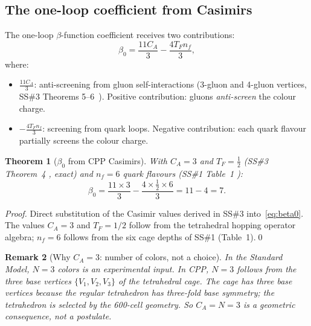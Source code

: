 \documentclass[11pt,a4paper]{article}
\newtheorem{theorem}{Theorem}[section]
\newtheorem{remark}[theorem]{Remark}
\begin{document}
\subsection{The one-loop coefficient from Casimirs}

The one-loop $\beta$-function coefficient receives two contributions:
\begin{equation}
\beta_0 = \frac{11C_A}{3} - \frac{4T_F n_f}{3},
\label{eq:beta0}
\end{equation}
where:
\begin{itemize}
\item $\frac{11C_A}{3}$: anti-screening from gluon self-interactions
  (3-gluon and 4-gluon vertices, SS\#3 Theorems 5--6~\citep{cpp_ss3}).
  Positive contribution: gluons \emph{anti-screen} the colour charge.
\item $-\frac{4T_F n_f}{3}$: screening from quark loops.
  Negative contribution: each quark flavour partially screens
  the colour charge.
\end{itemize}

\begin{theorem}[$\beta_0$ from CPP Casimirs]
\label{thm:beta0}
With $C_A = 3$ and $T_F = \frac{1}{2}$ (SS\#3 Theorem~4
\citep{cpp_ss3}, exact) and $n_f = 6$ quark flavours (SS\#1
Table~1 \citep{cpp_ss1}):
\begin{equation}
\beta_0
= \frac{11 \times 3}{3} - \frac{4 \times \tfrac{1}{2} \times 6}{3}
= 11 - 4
= 7.
\label{eq:beta0_cpp}
\end{equation}
\end{theorem}

\begin{proof}
Direct substitution of the Casimir values derived in SS\#3
into~\eqref{eq:beta0}.  The values $C_A = 3$ and $T_F = 1/2$
follow from the tetrahedral hopping operator algebra; $n_f = 6$
follows from the six cage depths of SS\#1 (Table~1).\qed
\end{proof}

\begin{remark}[Why $C_A = 3$: number of colors, not a choice]
In the Standard Model, $N = 3$ colors is an experimental input.
In CPP, $N = 3$ follows from the three base vertices $\{V_1, V_2,
V_3\}$ of the tetrahedral cage.  The cage has three base vertices
because the regular tetrahedron has three-fold base symmetry; the
tetrahedron is selected by the 600-cell geometry.  So
$C_A = N = 3$ is a geometric consequence, not a postulate.
\end{remark}
\end{document}

